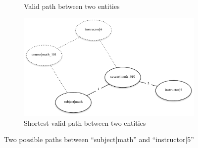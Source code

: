 \begin{ex}
\begin{figure}
\begin{subfigure}[b]{1.0\linewidth}
					\caption{Valid path between two entities}
					\label{fig:path-1}
				\end{subfigure}
				\begin{subfigure}[b]{1.0\linewidth}
					\centering
					\includegraphics[scale=0.9]{figures/graphs/path/instructor-to-course-path-2}
					
					\caption{Shortest valid path between two entities}
					\label{fig:path-2}
				\end{subfigure}
				
				\caption{Two possible paths between ``subject|math'' and ``instructor|5''}
				\label{fig:paths}
			\end{figure}
		\end{ex}
		
		
		
		
		
		
		
		
		
		
		
		
		
		